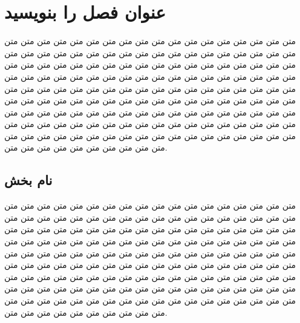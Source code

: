 \chapter{عنوان فصل را بنویسید}
متن متن متن متن متن متن متن متن متن متن متن متن متن متن متن متن متن متن متن متن متن متن متن متن متن متن متن متن متن متن متن متن متن متن متن متن متن متن متن متن متن متن متن متن متن متن متن متن متن متن متن متن متن متن متن متن متن متن متن متن متن متن متن متن متن متن متن متن متن متن متن متن متن متن متن متن متن متن متن متن متن متن متن متن متن متن متن متن متن متن متن متن متن متن متن متن متن متن متن متن متن متن متن متن متن متن متن متن متن متن متن متن متن متن متن متن متن متن متن متن متن متن متن متن متن متن متن متن متن متن متن متن متن متن متن متن متن متن متن متن متن متن متن متن متن متن متن متن متن متن متن متن متن متن متن متن متن متن متن متن متن متن متن متن متن متن متن متن متن متن متن متن.
\section{نام بخش}
متن متن متن متن متن متن متن متن متن متن متن متن متن متن متن متن متن متن متن متن متن متن متن متن متن متن متن متن متن متن متن متن متن متن متن متن متن متن متن متن متن متن متن متن متن متن متن متن متن متن متن متن متن متن متن متن متن متن متن متن متن متن متن متن متن متن متن متن متن متن متن متن متن متن متن متن متن متن متن متن متن متن متن متن متن متن متن متن متن متن متن متن متن متن متن متن متن متن متن متن متن متن متن متن متن متن متن متن متن متن متن متن متن متن متن متن متن متن متن متن متن متن متن متن متن متن متن متن متن متن متن متن متن متن متن متن متن متن متن متن متن متن متن متن متن متن متن متن متن متن متن متن متن متن متن متن متن متن متن متن متن متن متن متن متن متن متن متن متن متن متن متن.

